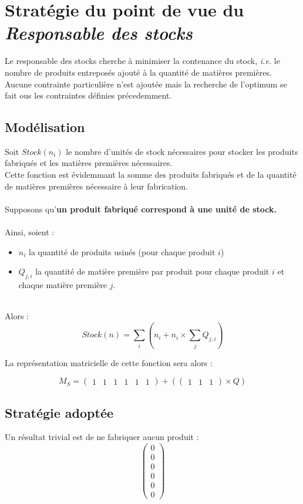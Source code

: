 \newpage
\section{Stratégie du point de vue du \textsl{Responsable des stocks}}
\label{stocks}

Le responsable des stocks cherche à minimiser la contenance du stock, \textsl{i.e.} le nombre de produits entreposés ajouté
à la quantité de matières premières. Aucune contrainte particulière n'est ajoutée mais la recherche de l'optimum se fait
ous les contraintes définies précedemment.

\subsection{Modélisation}
Soit $Stock(n_{i})$ le nombre d'unités de stock nécessaires pour stocker les
produits fabriqués et les matières premières nécessaires.\\
Cette fonction est évidemmant la somme des produits fabriqués et de la quantité de matières
premières nécessaire à leur fabrication.\\
~\\
Supposons qu'\textbf{un produit fabriqué correspond à une unité de stock.}\\
~\\
Ainsi, soient :
\begin{itemize}
	\item $n_{i}$ la quantité de produits usinés (pour chaque produit $i$)
	\item $Q_{j,i}$ la quantité de matière première par produit pour chaque produit $i$ et chaque matière première $j$.
\end{itemize}
~\\
Alors :
\begin{equation}
	Stock(n) = \sum_{i} (n_{i} + n_{i} \times \sum_{j} Q_{j,i})
\end{equation}

La représentation matricielle de cette fonction sera alors :

\begin{equation}
	M_S = \begin{pmatrix}
		1 & 1 & 1 & 1 & 1 & 1
	\end{pmatrix} + (
	\begin{pmatrix}
		1 & 1 & 1
	\end{pmatrix}
	\times Q)
\end{equation}

\subsection{Stratégie adoptée}
Un résultat trivial est de ne fabriquer aucun produit :
\begin{equation}
    \begin{pmatrix}
	0 \\ 0 \\ 0 \\ 0 \\ 0 \\ 0
    \end{pmatrix}
\end{equation}

